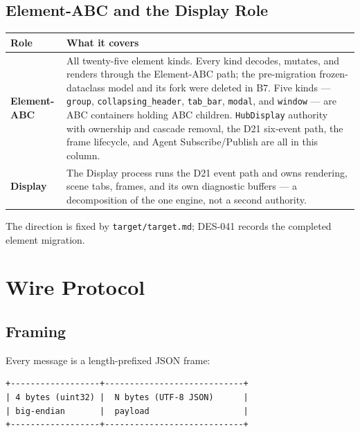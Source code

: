 \documentclass[a4paper,10pt]{article}
\begin{document}
\subsection{Element-ABC and the Display Role}

\begin{center}
\begin{tabular}{lp{9.5cm}}
\toprule
\textbf{Role} & \textbf{What it covers} \\
\midrule
\textbf{Element-ABC}  & All twenty-five element kinds.  Every kind decodes,
  mutates, and renders through the Element-ABC path; the pre-migration
  frozen-dataclass model and its fork were deleted in B7. Five kinds ---
  \texttt{group}, \texttt{collapsing\_header}, \texttt{tab\_bar},
  \texttt{modal}, and \texttt{window} --- are ABC
  containers holding ABC children.  \texttt{HubDisplay} authority with
  ownership and cascade removal, the D21 six-event path, the frame
  lifecycle, and Agent Subscribe/Publish are all in this column. \\
\textbf{Display}      & The Display process runs the D21 event path and owns
  rendering, scene tabs, frames, and its own diagnostic buffers --- a
  decomposition of the one engine, not a second authority. \\
\bottomrule
\end{tabular}
\end{center}

The direction is fixed by \texttt{target/target.md}; DES-041 records the
completed element migration.

\section{Wire Protocol}

\subsection{Framing}

Every message is a length-prefixed JSON frame:

\begin{lstlisting}
+------------------+----------------------------+
| 4 bytes (uint32) |  N bytes (UTF-8 JSON)      |
| big-endian       |  payload                   |
+------------------+----------------------------+
\end{lstlisting}
\end{document}
